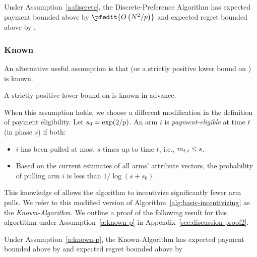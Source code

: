 \begin{theorem}
\label{rst:discrete}
Under Assumption~\ref{a:discrete}, the Discrete-Preference Algorithm has expected payment  bounded above by 
$\pfedit{O \left(\ARMNUM^2 /p \right)}$
and expected regret bounded above by .
\end{theorem}



\subsubsection{Known \MinProb}
An alternative useful assumption is that \MinProb (or a strictly positive lower bound on \MinProb) is known.

\begin{assumption}
\label{a:known-p}
A strictly positive lower bound on \MinProb is known in advance.
\end{assumption}

When this assumption holds, we choose a different modification in the definition of payment eligibility.
Let $s_0 = \exp(2/p)$.
An arm $i$ is \emph{payment-eligible} at time $t$ (in phase $s$)
if both: 
\begin{itemize}
\item $i$ has been pulled at most
$s$ times up to time $t$, i.e., $m_{t,i} \leq s$.
\item Based on the current estimates  of all arms' attribute vectors, the probability of pulling arm $i$ is less than $1/\log(s+s_0)$.
\end{itemize}

This knowledge of \MinProb allows the algorithm to incentivize
significantly fewer arm pulls.
We refer to this modified version of Algorithm~\ref{alg:basic-incentivizing} as the \emph{Known-\MinProb Algorithm.}
We outline a proof of the following result for this algortithm under Assumption~\ref{a:known-p} in Appendix~\ref{sec:discussion-proof2}.

\begin{theorem}
\label{rst:known-p}
Under Assumption~\ref{a:known-p}, the Known-\MinProb Algorithm has expected payment  bounded above by 
and expected regret bounded above by
\end{theorem}

